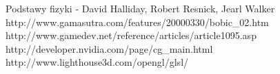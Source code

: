 \documentclass[12pt,a4paper]{article}
\begin{document}


\fancyhf{}

\rhead{\today}
\rfoot{\thepage}



\tableofcontents
\newpage









\clearpage
{}
\begin{thebibliography}{99}
 Podstawy fizyki - David Halliday, Robert Resnick, Jearl Walker
 http://www.gamasutra.com/features/20000330/bobic\_02.htm
 http://www.gamedev.net/reference/articles/article1095.asp
 http://developer.nvidia.com/page/cg\_main.html
 http://www.lighthouse3d.com/opengl/glsl/
\end{thebibliography}
\end{document}
